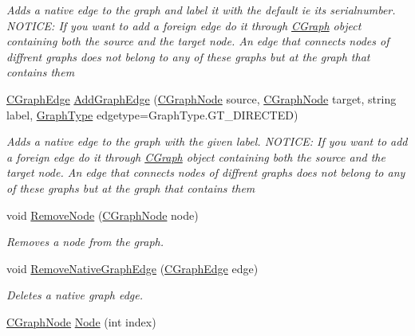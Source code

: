 \begin{DoxyCompactItemize}
\begin{DoxyCompactList}\small\item\em Adds a native edge to the graph and label it with the default ie its serialnumber. N\+O\+T\+I\+C\+E\+: If you want to add a foreign edge do it through \hyperlink{class_graph_library_1_1_c_graph}{C\+Graph} object containing both the source and the target node. An edge that connects nodes of diffrent graphs does not belong to any of these graphs but at the graph that contain\textquotesingle{}s them \end{DoxyCompactList}\item 
\hyperlink{class_graph_library_1_1_c_graph_edge}{C\+Graph\+Edge} \hyperlink{class_graph_library_1_1_c_graph_af57fff06c0780defe3574dbe22c51902}{Add\+Graph\+Edge} (\hyperlink{class_graph_library_1_1_c_graph_node}{C\+Graph\+Node} source, \hyperlink{class_graph_library_1_1_c_graph_node}{C\+Graph\+Node} target, string label, \hyperlink{namespace_graph_library_1_1_generics_a1bac729ea88e6f3925406df33f15d056}{Graph\+Type} edgetype=Graph\+Type.\+G\+T\+\_\+\+D\+I\+R\+E\+C\+T\+E\+D)
\begin{DoxyCompactList}\small\item\em Adds a native edge to the graph with the given label. N\+O\+T\+I\+C\+E\+: If you want to add a foreign edge do it through \hyperlink{class_graph_library_1_1_c_graph}{C\+Graph} object containing both the source and the target node. An edge that connects nodes of diffrent graphs does not belong to any of these graphs but at the graph that contain\textquotesingle{}s them \end{DoxyCompactList}\item 
void \hyperlink{class_graph_library_1_1_c_graph_a572ac323b5642ac9ba3a8755748b3f5e}{Remove\+Node} (\hyperlink{class_graph_library_1_1_c_graph_node}{C\+Graph\+Node} node)
\begin{DoxyCompactList}\small\item\em Removes a node from the graph. \end{DoxyCompactList}\item 
void \hyperlink{class_graph_library_1_1_c_graph_a3e02229a24c28d1ebbf3ec5f12d1a145}{Remove\+Native\+Graph\+Edge} (\hyperlink{class_graph_library_1_1_c_graph_edge}{C\+Graph\+Edge} edge)
\begin{DoxyCompactList}\small\item\em Deletes a native graph edge. \end{DoxyCompactList}\item 
\hyperlink{class_graph_library_1_1_c_graph_node}{C\+Graph\+Node} \hyperlink{class_graph_library_1_1_c_graph_a93fba5a60f4cec728a6511049bc7c079}{Node} (int index)

\end{DoxyCompactItemize}
